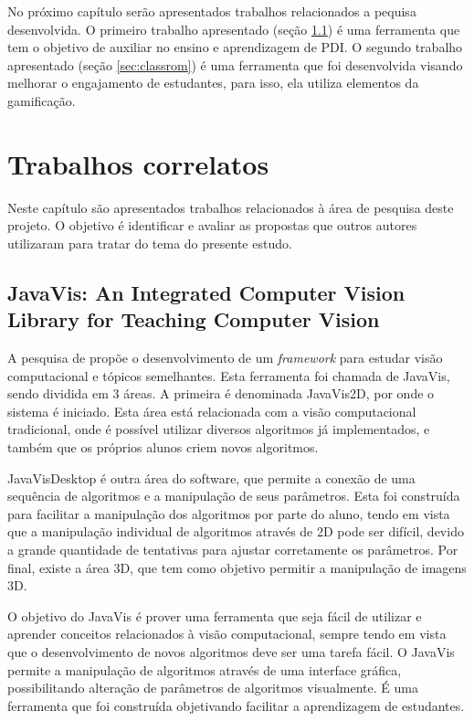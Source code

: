\documentclass[
	12pt,				%
	oneside,			%
	a4paper,			%
	english,			%
	french,				%
	spanish,			%
	brazil,				%
	]{abntex2}
\begin{document}
No próximo capítulo serão apresentados trabalhos relacionados a pequisa desenvolvida. O primeiro trabalho apresentado (seção \ref{sec:javavis}) é uma ferramenta que tem o objetivo de auxiliar no ensino e aprendizagem de PDI. O segundo trabalho apresentado (seção \ref{sec:classrom}) é uma ferramenta que foi desenvolvida visando melhorar o engajamento de estudantes, para isso, ela utiliza elementos da gamificação.

\chapter{Trabalhos correlatos}
\label{sec:trabalhosCorrelatos}

Neste capítulo são apresentados trabalhos relacionados à área de pesquisa deste projeto. O objetivo é identificar e avaliar as propostas que outros autores utilizaram para tratar do tema do presente estudo.

\section{JavaVis: An Integrated Computer Vision Library for Teaching Computer Vision}
\label{sec:javavis}

A pesquisa de \citet{cazorla2015javavis} propõe o desenvolvimento de um \textit{framework} para estudar visão computacional e tópicos semelhantes. Esta ferramenta foi chamada de JavaVis, sendo  dividida em 3 áreas. A primeira é denominada JavaVis2D, por onde o sistema é iniciado. Esta área está relacionada com a visão computacional tradicional, onde é possível utilizar diversos algoritmos já implementados, e também que os próprios alunos criem novos algoritmos. 

JavaVisDesktop é outra área do software, que permite a conexão de uma sequência de algoritmos e a manipulação de seus parâmetros. Esta foi construída para facilitar a manipulação dos algoritmos por parte do aluno, tendo em vista que a manipulação individual de algoritmos através de 2D pode ser difícil, devido a grande quantidade de tentativas para ajustar corretamente os parâmetros. Por final, existe a área 3D, que tem como objetivo permitir a manipulação de imagens 3D.

O objetivo do JavaVis é prover uma ferramenta que seja fácil de utilizar e aprender conceitos relacionados à visão computacional, sempre tendo em vista que o desenvolvimento de novos algoritmos deve ser uma tarefa fácil. O JavaVis permite a manipulação de algoritmos através de uma interface gráfica, possibilitando alteração de parâmetros de algoritmos visualmente. É uma ferramenta que foi construída objetivando facilitar a aprendizagem de estudantes.
\end{document}
